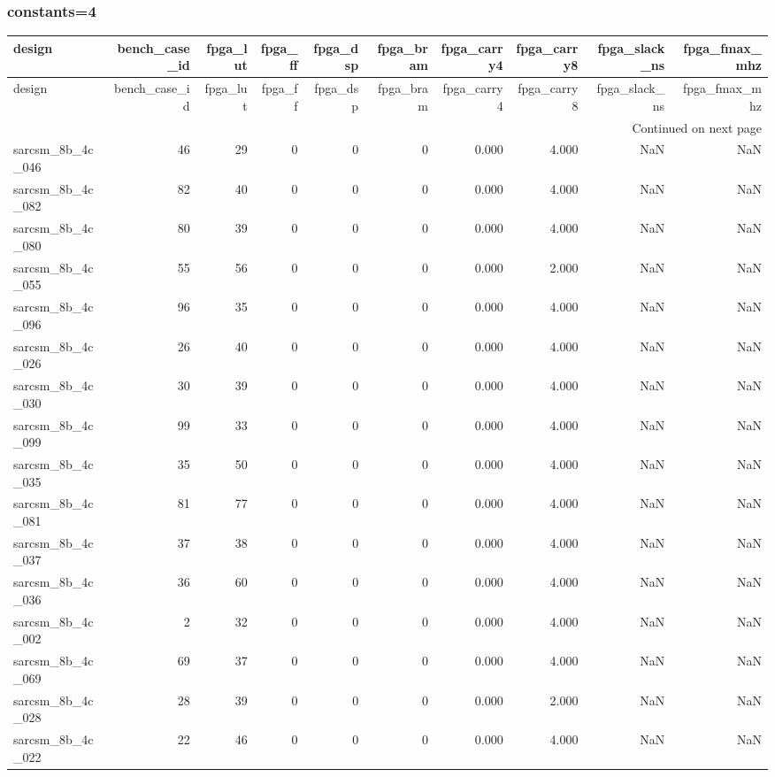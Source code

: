 \documentclass{article}
\begin{document}
\subsubsection*{constants=4}
\begin{longtable}{lrrrrrrrrr}
\toprule
design & bench\_case\_id & fpga\_lut & fpga\_ff & fpga\_dsp & fpga\_bram & fpga\_carry4 & fpga\_carry8 & fpga\_slack\_ns & fpga\_fmax\_mhz \\
\midrule
\endfirsthead
\toprule
design & bench\_case\_id & fpga\_lut & fpga\_ff & fpga\_dsp & fpga\_bram & fpga\_carry4 & fpga\_carry8 & fpga\_slack\_ns & fpga\_fmax\_mhz \\
\midrule
\endhead
\midrule
\multicolumn{10}{r}{Continued on next page} \\
\midrule
\endfoot
\bottomrule
\endlastfoot
sarcsm\_8b\_4c\_046 & 46 & 29 & 0 & 0 & 0 & 0.000 & 4.000 & NaN & NaN \\
sarcsm\_8b\_4c\_082 & 82 & 40 & 0 & 0 & 0 & 0.000 & 4.000 & NaN & NaN \\
sarcsm\_8b\_4c\_080 & 80 & 39 & 0 & 0 & 0 & 0.000 & 4.000 & NaN & NaN \\
sarcsm\_8b\_4c\_055 & 55 & 56 & 0 & 0 & 0 & 0.000 & 2.000 & NaN & NaN \\
sarcsm\_8b\_4c\_096 & 96 & 35 & 0 & 0 & 0 & 0.000 & 4.000 & NaN & NaN \\
sarcsm\_8b\_4c\_026 & 26 & 40 & 0 & 0 & 0 & 0.000 & 4.000 & NaN & NaN \\
sarcsm\_8b\_4c\_030 & 30 & 39 & 0 & 0 & 0 & 0.000 & 4.000 & NaN & NaN \\
sarcsm\_8b\_4c\_099 & 99 & 33 & 0 & 0 & 0 & 0.000 & 4.000 & NaN & NaN \\
sarcsm\_8b\_4c\_035 & 35 & 50 & 0 & 0 & 0 & 0.000 & 4.000 & NaN & NaN \\
sarcsm\_8b\_4c\_081 & 81 & 77 & 0 & 0 & 0 & 0.000 & 4.000 & NaN & NaN \\
sarcsm\_8b\_4c\_037 & 37 & 38 & 0 & 0 & 0 & 0.000 & 4.000 & NaN & NaN \\
sarcsm\_8b\_4c\_036 & 36 & 60 & 0 & 0 & 0 & 0.000 & 4.000 & NaN & NaN \\
sarcsm\_8b\_4c\_002 & 2 & 32 & 0 & 0 & 0 & 0.000 & 4.000 & NaN & NaN \\
sarcsm\_8b\_4c\_069 & 69 & 37 & 0 & 0 & 0 & 0.000 & 4.000 & NaN & NaN \\
sarcsm\_8b\_4c\_028 & 28 & 39 & 0 & 0 & 0 & 0.000 & 2.000 & NaN & NaN \\
sarcsm\_8b\_4c\_022 & 22 & 46 & 0 & 0 & 0 & 0.000 & 4.000 & NaN & NaN \\

\end{longtable}
\end{document}
